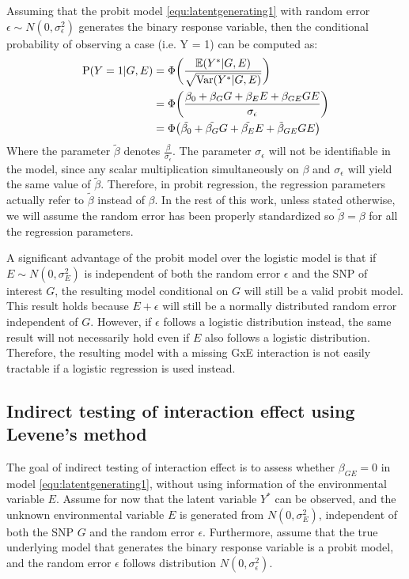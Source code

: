 Assuming that the probit model \ref{equ:latentgenerating1} with random error $\epsilon \sim N(0,\sigma_\epsilon^2)$ generates the binary response variable, then the conditional probability of observing a case (i.e. Y = 1) can be computed as:
\begin{equation}\label{equ:computationOfProb}
\begin{aligned}
\text{P}(Y=1|G,E) &= \Phi\bigg(\frac{\mathbb{E}(Y^*|G,E)}{\sqrt{\text{Var}(Y^*|G,E)}}\bigg)\\
&= \Phi\bigg(\frac{\beta_0+\beta_GG+\beta_EE + \beta_{GE}GE}{\sigma_\epsilon}\bigg)\\
&= \Phi\big(\tilde{\beta_0}+\tilde{\beta_G}G+\tilde{\beta_E}E + \tilde{\beta}_{GE} GE\big)
\end{aligned}
\end{equation}
Where the parameter $\tilde{\beta}$ denotes $\frac{\beta}{\sigma_\epsilon}$. The parameter $\sigma_\epsilon$ will not be identifiable in the model, since any scalar multiplication simultaneously on $\beta$ and $\sigma_\epsilon$ will yield the same value of $\tilde{\beta}$. Therefore, in probit regression, the regression parameters actually refer to $\tilde{\beta}$ instead of $\beta$. In the rest of this work, unless stated otherwise, we will assume the random error has been properly standardized so $\tilde{\beta} = \beta$ for all the regression parameters.


A significant advantage of the probit model over the logistic model is that if $E \sim N(0,\sigma_E^2)$ is independent of both the random error $\epsilon$ and the SNP of interest $G$, the resulting model conditional on $G$ will still be a valid probit model. This result holds because $E + \epsilon$ will still be a normally distributed random error independent of $G$. However, if $\epsilon$ follows a logistic distribution instead, the same result will not necessarily hold even if $E$ also follows a logistic distribution. Therefore, the resulting model with a missing GxE interaction is not easily tractable if a logistic regression is used instead.



\subsection{Indirect testing of interaction effect using Levene's method}

The goal of indirect testing of interaction effect is to assess whether $\beta_{GE} = 0$ in model \ref{equ:latentgenerating1}, without using information of the environmental variable $E$. Assume for now that the latent variable $Y^*$ can be observed, and the unknown environmental variable $E$ is generated from $N(0,\sigma_E^2)$, independent of both the SNP $G$ and the random error $\epsilon$. Furthermore, assume that the true underlying model that generates the binary response variable is a probit model, and the random error $\epsilon$ follows distribution $N(0,\sigma_\epsilon^2)$.


